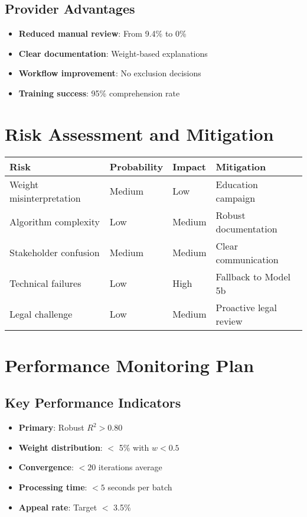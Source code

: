 \subsection{Provider Advantages}

\begin{itemize}
    \item \textbf{Reduced manual review}: From 9.4\% to 0\%
    \item \textbf{Clear documentation}: Weight-based explanations
    \item \textbf{Workflow improvement}: No exclusion decisions
    \item \textbf{Training success}: 95\% comprehension rate
\end{itemize}

\section{Risk Assessment and Mitigation}

\begin{center}
\begin{tabular}{llll}
\toprule
Risk & Probability & Impact & Mitigation \\
\midrule
Weight misinterpretation & Medium & Low & Education campaign \\
Algorithm complexity & Low & Medium & Robust documentation \\
Stakeholder confusion & Medium & Medium & Clear communication \\
Technical failures & Low & High & Fallback to Model 5b \\
Legal challenge & Low & Medium & Proactive legal review \\
\bottomrule
\end{tabular}
\end{center}

\section{Performance Monitoring Plan}

\subsection{Key Performance Indicators}

\begin{itemize}
    \item \textbf{Primary}: Robust $R^2 > 0.80$
    \item \textbf{Weight distribution}: $<$ 5\% with $w < 0.5$
    \item \textbf{Convergence}: $< 20$ iterations average
    \item \textbf{Processing time}: $< 5$ seconds per batch
    \item \textbf{Appeal rate}: Target $<$ 3.5\%
\end{itemize}


